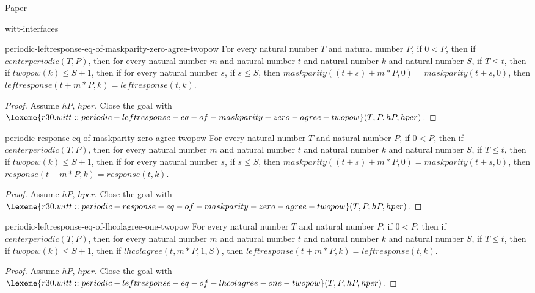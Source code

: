 \begin{lexlean}{Paper}
\begin{section}{witt-interfaces}
  \begin{theorem}{periodic-leftresponse-eq-of-maskparity-zero-agree-twopow}
  For every natural number \(T\) and natural number \(P\), if \(0 < P\), then if \(centerperiodic(T, P)\), then for every natural number \(m\) and natural number \(t\) and natural number \(k\) and natural number \(S\), if \(T ≤ t\), then if \(twopow(k) ≤ S + 1\), then if for every natural number \(s\), if \(s ≤ S\), then \(maskparity((t + s) + m * P, 0) = maskparity(t + s, 0)\), then \(leftresponse(t + m * P, k) = leftresponse(t, k)\).
  \begin{proof}
  Assume \(hP\), \(hper\).
  Close the goal with \(\lexeme{r30.witt::periodic-leftresponse-eq-of-maskparity-zero-agree-twopow}(T, P, hP, hper)\).
  \end{proof}
  \end{theorem}

  \begin{theorem}{periodic-response-eq-of-maskparity-zero-agree-twopow}
  For every natural number \(T\) and natural number \(P\), if \(0 < P\), then if \(centerperiodic(T, P)\), then for every natural number \(m\) and natural number \(t\) and natural number \(k\) and natural number \(S\), if \(T ≤ t\), then if \(twopow(k) ≤ S + 1\), then if for every natural number \(s\), if \(s ≤ S\), then \(maskparity((t + s) + m * P, 0) = maskparity(t + s, 0)\), then \(response(t + m * P, k) = response(t, k)\).
  \begin{proof}
  Assume \(hP\), \(hper\).
  Close the goal with \(\lexeme{r30.witt::periodic-response-eq-of-maskparity-zero-agree-twopow}(T, P, hP, hper)\).
  \end{proof}
  \end{theorem}

  \begin{theorem}{periodic-leftresponse-eq-of-lhcolagree-one-twopow}
  For every natural number \(T\) and natural number \(P\), if \(0 < P\), then if \(centerperiodic(T, P)\), then for every natural number \(m\) and natural number \(t\) and natural number \(k\) and natural number \(S\), if \(T ≤ t\), then if \(twopow(k) ≤ S + 1\), then if \(lhcolagree(t, m * P, 1, S)\), then \(leftresponse(t + m * P, k) = leftresponse(t, k)\).
  \begin{proof}
  Assume \(hP\), \(hper\).
  Close the goal with \(\lexeme{r30.witt::periodic-leftresponse-eq-of-lhcolagree-one-twopow}(T, P, hP, hper)\).
  \end{proof}
  \end{theorem}


\end{section}
\end{lexlean}
